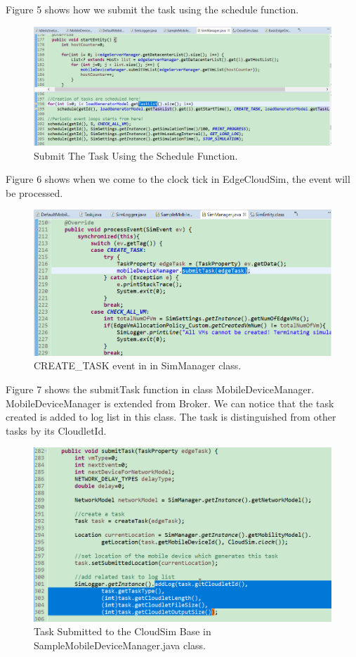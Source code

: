 Figure 5 shows how we submit the task using the schedule function.
\begin{figure}
	\centering
	\includegraphics[width=1\textwidth]{./figures/schedule-submitTask.png}
	\caption{\label{fig:frog}Submit The Task Using the Schedule Function.}
\end{figure}


Figure 6 shows when we come to the clock tick in EdgeCloudSim, the event will be processed.
\begin{figure}
	\centering
	\includegraphics[width=1\textwidth]{./figures/5-SimManager-ProcessEvent-CREAT_TASK.png}
	\caption{\label{fig:frog}CREATE\_TASK event in in SimManager class.}
\end{figure}

Figure 7 shows the submitTask function in class MobileDeviceManager. MobileDeviceManager is extended from Broker. We can notice that the task created is added to log list in this class. The task is distinguished from other tasks by its CloudletId. 
\begin{figure}
	\centering
	\includegraphics[width=1\textwidth]{./figures/4-submitTask-SampleMobileDeviceManager.png}
	\caption{\label{fig:frog}Task Submitted to the CloudSim Base in SampleMobileDeviceManager.java class.}
\end{figure}

